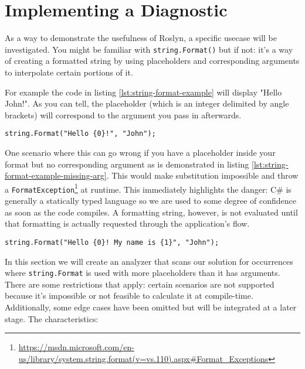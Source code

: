 \chapter{Implementing a Diagnostic}
\label{ch:diagnostic}

As a way to demonstrate the usefulness of Roslyn, a specific usecase will be investigated. You might be familiar with \texttt{string.Format()} but if not: it's a way of creating a formatted string by using placeholders and corresponding arguments to interpolate certain portions of it. 

For example the code in listing \ref{lst:string-format-example} will display "Hello John!". As you can tell, the placeholder (which is an integer delimited by angle brackets) will correspond to the argument you pass in afterwards.

\begin{lstlisting}[label={lst:string-format-example}]
string.Format("Hello {0}!", "John");
\end{lstlisting}

One scenario where this can go wrong if you have a placeholder inside your format but no corresponding argument as is demonstrated in listing \ref{lst:string-format-example-missing-arg}. This would make substitution impossible and throw a \texttt{FormatException}\footnote{\url{https://msdn.microsoft.com/en-us/library/system.string.format(v=vs.110).aspx\#Format_Exceptions}} at runtime. This immediately highlights the danger: C\# is generally a statically typed language so we are used to some degree of confidence as soon as the code compiles. A formatting string, however, is not evaluated until that formatting is actually requested through the application's flow. 

\begin{lstlisting}[label={lst:string-format-example-missing-arg}]
string.Format("Hello {0}! My name is {1}", "John");
\end{lstlisting}

In this section we will create an analyzer that scans our solution for occurrences where \texttt{string.Format} is used with more placeholders than it has arguments. 
There are some restrictions that apply: certain scenarios are not supported because it's impossible or not feasible to calculate it at compile-time. Additionally, some edge cases have been omitted but will be integrated at a later stage. The characteristics:

